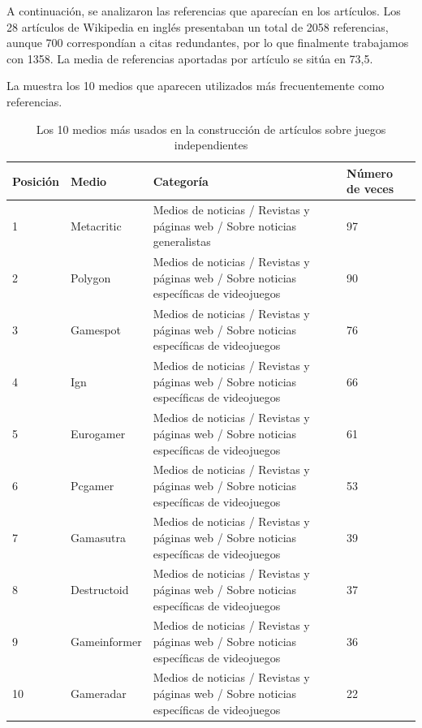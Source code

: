 \documentclass[spanish]{textolivre}
\begin{document}
A continuación, se analizaron las referencias que aparecían en los artículos. Los 28 artículos de Wikipedia en inglés presentaban un total de 2058 referencias, aunque 700 correspondían a citas redundantes, por lo que finalmente trabajamos con 1358. La media de referencias aportadas por artículo se sitúa en 73,5.

La  muestra los 10 medios que aparecen utilizados más frecuentemente como referencias.

\begin{table}[h!]
\centering
\begin{threeparttable}
\caption{Los 10 medios más usados en la construcción de artículos sobre juegos independientes}
\label{tab03}
\begin{tabular}{llp{7cm}l}
\toprule
Posición & Medio & Categoría & Número de veces \\ 
\midrule
1 & Metacritic & Medios de noticias / Revistas y páginas web / Sobre noticias generalistas & 97 \\ 
2 & Polygon & Medios de noticias / Revistas y páginas web / Sobre noticias específicas de videojuegos & 90 \\
3 & Gamespot & Medios de noticias / Revistas y páginas web / Sobre noticias específicas de videojuegos & 76 \\
4 & Ign & Medios de noticias / Revistas y páginas web / Sobre noticias específicas de videojuegos & 66 \\ 
5 & Eurogamer & Medios de noticias / Revistas y páginas web / Sobre noticias específicas de videojuegos & 61 \\ 
6 & Pcgamer & Medios de noticias / Revistas y páginas web / Sobre noticias específicas de videojuegos & 53 \\ 
7 & Gamasutra & Medios de noticias / Revistas y páginas web / Sobre noticias específicas de videojuegos & 39 \\ 
8 & Destructoid & Medios de noticias / Revistas y páginas web / Sobre noticias específicas de videojuegos & 37 \\ 
9 & Gameinformer & Medios de noticias / Revistas y páginas web / Sobre noticias específicas de videojuegos & 36 \\ 
10 & Gameradar & Medios de noticias / Revistas y páginas web / Sobre noticias específicas de videojuegos & 22 \\
\bottomrule
\end{tabular}%
\end{threeparttable}
\end{table}
\end{document}

